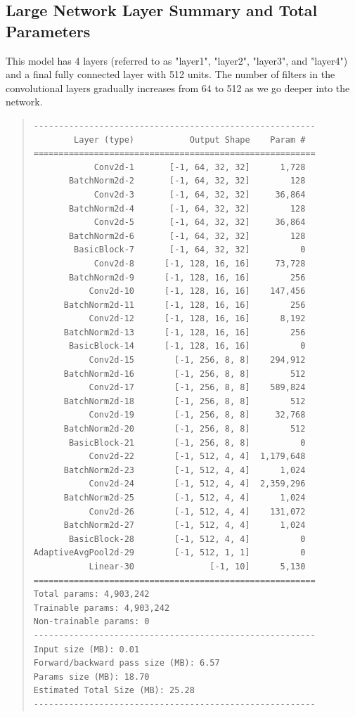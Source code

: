 \documentclass[letterpaper]{article} %
\begin{document}
\subsection{Large Network Layer Summary and Total Parameters}
This model has 4 layers (referred to as "layer1", "layer2", "layer3", and "layer4") and a final fully connected layer with 512 units. The number of filters in the convolutional layers gradually increases from 64 to 512 as we go deeper into the network.
\begin{quote}
\begin{scriptsize}\begin{verbatim}
--------------------------------------------------------
        Layer (type)           Output Shape    Param #
========================================================
            Conv2d-1       [-1, 64, 32, 32]      1,728
       BatchNorm2d-2       [-1, 64, 32, 32]        128
            Conv2d-3       [-1, 64, 32, 32]     36,864
       BatchNorm2d-4       [-1, 64, 32, 32]        128
            Conv2d-5       [-1, 64, 32, 32]     36,864
       BatchNorm2d-6       [-1, 64, 32, 32]        128
        BasicBlock-7       [-1, 64, 32, 32]          0
            Conv2d-8      [-1, 128, 16, 16]     73,728
       BatchNorm2d-9      [-1, 128, 16, 16]        256
           Conv2d-10      [-1, 128, 16, 16]    147,456
      BatchNorm2d-11      [-1, 128, 16, 16]        256
           Conv2d-12      [-1, 128, 16, 16]      8,192
      BatchNorm2d-13      [-1, 128, 16, 16]        256
       BasicBlock-14      [-1, 128, 16, 16]          0
           Conv2d-15        [-1, 256, 8, 8]    294,912
      BatchNorm2d-16        [-1, 256, 8, 8]        512
           Conv2d-17        [-1, 256, 8, 8]    589,824
      BatchNorm2d-18        [-1, 256, 8, 8]        512
           Conv2d-19        [-1, 256, 8, 8]     32,768
      BatchNorm2d-20        [-1, 256, 8, 8]        512
       BasicBlock-21        [-1, 256, 8, 8]          0
           Conv2d-22        [-1, 512, 4, 4]  1,179,648
      BatchNorm2d-23        [-1, 512, 4, 4]      1,024
           Conv2d-24        [-1, 512, 4, 4]  2,359,296
      BatchNorm2d-25        [-1, 512, 4, 4]      1,024
           Conv2d-26        [-1, 512, 4, 4]    131,072
      BatchNorm2d-27        [-1, 512, 4, 4]      1,024
       BasicBlock-28        [-1, 512, 4, 4]          0
AdaptiveAvgPool2d-29        [-1, 512, 1, 1]          0
           Linear-30               [-1, 10]      5,130
========================================================
Total params: 4,903,242
Trainable params: 4,903,242
Non-trainable params: 0
--------------------------------------------------------
Input size (MB): 0.01
Forward/backward pass size (MB): 6.57
Params size (MB): 18.70
Estimated Total Size (MB): 25.28
--------------------------------------------------------
\end{verbatim}\end{scriptsize}
\end{quote}\textbf{}
\end{document}
